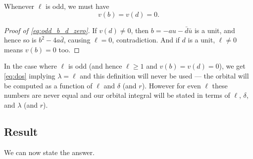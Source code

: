 \begin{proposition}
  Whenever $\ell$ is odd, we must have
  \begin{equation}
    v(b) = v(d) = 0.
    \label{eq:odd_b_d_zero}
  \end{equation}
\end{proposition}
\begin{proof}
  [Proof of \eqref{eq:odd_b_d_zero}]
  If $v(d) \neq 0$, then $b = -au-\bar d\bar u$ is a unit,
  and hence so is $b^2 - 4 a \bar d$, causing $\ell = 0$, contradiction.
  And if $d$ is a unit, $\ell \neq 0$ means $v(b) = 0$ too.
\end{proof}

In the case where $\ell$ is odd (and hence $\ell \ge 1$ and $v(b) = v(d) = 0$),
we get \eqref{eq:dos} implying $\lambda = \ell$
and this definition will never be used --- the orbital will be computed
as a function of $\ell$ and $\delta$ (and $r$).
However for even $\ell$ these numbers are never equal and our orbital
integral will be stated in terms of $\ell$, $\delta$, and $\lambda$ (and $r$).

\subsection{Result}
We can now state the answer.
